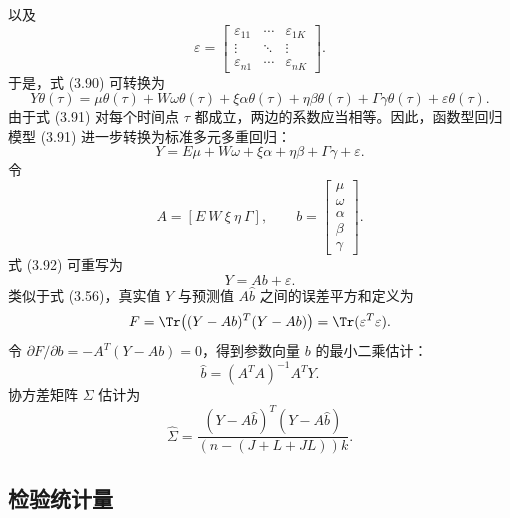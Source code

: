以及
\[
\varepsilon=\begin{bmatrix}\varepsilon_{11}&\cdots&\varepsilon_{1K}\\\vdots&\ddots&\vdots\\\varepsilon_{n1}&\cdots&\varepsilon_{nK}\end{bmatrix}.
\]
于是，式 (3.90) 可转换为
\begin{equation}
Y\theta(\tau)=\mu\theta(\tau)+W\omega\theta(\tau)+\xi\alpha\theta(\tau)
+\eta\beta\theta(\tau)+\Gamma\gamma\theta(\tau)+\varepsilon\theta(\tau).
\tag{3.91}
\end{equation}
由于式 (3.91) 对每个时间点 $\tau$ 都成立，两边的系数应当相等。因此，函数型回归模型 (3.91) 进一步转换为标准多元多重回归：
\begin{equation}
Y=E\mu+W\omega+\xi\alpha+\eta\beta+\Gamma\gamma+\varepsilon.
\tag{3.92}
\end{equation}
令
\[
A=[E\ W\ \xi\ \eta\ \Gamma],\qquad
b=\begin{bmatrix}\mu\\\omega\\\alpha\\\beta\\\gamma\end{bmatrix}.
\]
式 (3.92) 可重写为
\begin{equation}
Y=Ab+\varepsilon.
\tag{3.93}
\end{equation}
类似于式 (3.56)，真实值 $Y$ 与预测值 $A\hat b$ 之间的误差平方和定义为
\[
F=\Tr\bigl((Y-Ab)^T(Y-Ab)\bigr)=\Tr(\varepsilon^T\varepsilon).
\]
令 $\partial F/\partial b=-A^T(Y-Ab)=0$，得到参数向量 $b$ 的最小二乘估计：
\begin{equation}
\hat b=(A^TA)^{-1}A^TY.
\tag{3.94}
\end{equation}
协方差矩阵 $\Sigma$ 估计为
\[
\hat\Sigma=\frac{(Y-A\hat b)^T(Y-A\hat b)}{(n-(J+L+JL))k}.
\]

\subsection{检验统计量}

